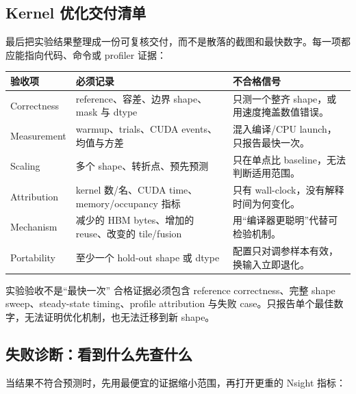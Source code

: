 \subsection{Kernel 优化交付清单}

最后把实验结果整理成一份可复核交付，而不是散落的截图和最快数字。每一项都应能指向代码、命令或 profiler 证据：

\begin{longtable}{p{}p{}p{}}
\toprule
\textbf{验收项} & \textbf{必须记录} & \textbf{不合格信号} \\
\midrule
Correctness & reference、容差、边界 shape、mask 与 dtype & 只测一个整齐 shape，或用速度掩盖数值错误。 \\
Measurement & warmup、trials、CUDA events、均值与方差 & 混入编译/CPU launch，只报告最快一次。 \\
Scaling & 多个 shape、转折点、预先预测 & 只在单点比 baseline，无法判断适用范围。 \\
Attribution & kernel 数/名、CUDA time、memory/occupancy 指标 & 只有 wall-clock，没有解释时间为何变化。 \\
Mechanism & 减少的 HBM bytes、增加的 reuse、改变的 tile/fusion & 用“编译器更聪明”代替可检验机制。 \\
Portability & 至少一个 hold-out shape 或 dtype & 配置只对调参样本有效，换输入立即退化。 \\
\bottomrule
\end{longtable}

\begin{warningbox}{实验验收不是“最快一次”}
合格证据必须包含 reference correctness、完整 shape sweep、steady-state timing、profile attribution 与失败 case。只报告单个最佳数字，无法证明优化机制，也无法迁移到新 shape。
\end{warningbox}

\subsection{失败诊断：看到什么先查什么}

当结果不符合预测时，先用最便宜的证据缩小范围，再打开更重的 Nsight 指标：

